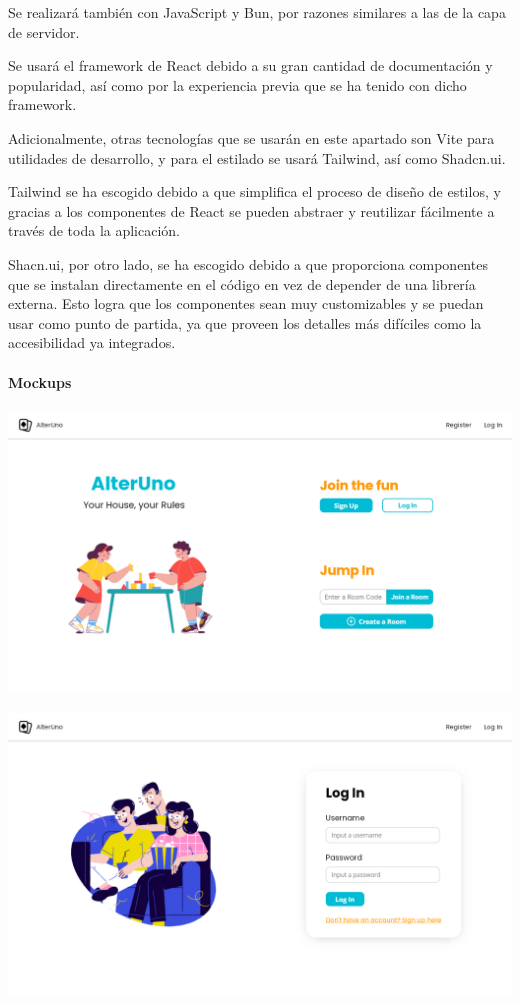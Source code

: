 Se realizará también con JavaScript y Bun, por razones similares a las de la capa de servidor. 

Se usará el framework de React debido a su gran cantidad de documentación y popularidad,
así como por la experiencia previa que se ha tenido con dicho framework. 

Adicionalmente, otras tecnologías que se usarán en este apartado son Vite para
utilidades de desarrollo, y para el estilado se usará Tailwind, así como Shadcn.ui.

Tailwind se ha escogido debido a que simplifica el proceso de diseño de estilos,
y gracias a los componentes de React se pueden abstraer y reutilizar fácilmente
a través de toda la aplicación. 

Shacn.ui, por otro lado, se ha escogido debido a que proporciona componentes
que se instalan directamente en el código en vez de depender de una librería externa.
Esto logra que los componentes sean muy customizables y se puedan usar como punto de partida,
ya que proveen los detalles más difíciles como la accesibilidad ya integrados.

\paragraph{Mockups}

\begin{center}
  \includegraphics[width=1\textwidth]{img/Mockup Main Page}
   \label{fig:mainmockup}
\end{center}

\begin{center}
  \includegraphics[width=1\textwidth]{img/Mockup Log In}
   \label{fig:loginmockup}
\end{center}

